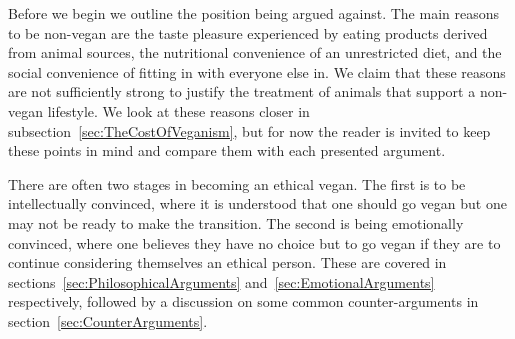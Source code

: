Before we begin we outline the position being argued against. The main reasons to be non-vegan are the taste pleasure experienced by eating products derived from animal sources, the nutritional convenience of an unrestricted diet, and the social convenience of fitting in with everyone else in. We claim that these reasons are not sufficiently strong to justify the treatment of animals that support a non-vegan lifestyle. We look at these reasons closer in subsection~\ref{sec:TheCostOfVeganism}, but for now the reader is invited to keep these points in mind and compare them with each presented argument.

There are often two stages in becoming an ethical vegan. The first is to be intellectually convinced, where it is understood that one should go vegan but one may not be ready to make the transition. The second is being emotionally convinced, where one believes they have no choice but to go vegan if they are to continue considering themselves an ethical person. These are covered in sections~\ref{sec:PhilosophicalArguments} and~\ref{sec:EmotionalArguments} respectively, followed by a discussion on some common counter-arguments in section~\ref{sec:CounterArguments}.

